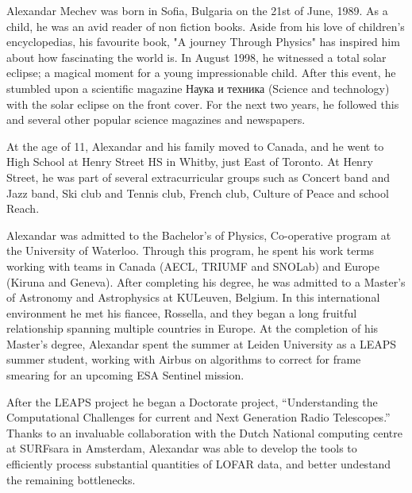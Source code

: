 Alexandar Mechev was born in Sofia, Bulgaria on the 21st of June, 1989. As a child, he was an avid reader of non fiction books. Aside from his love of children's encyclopedias, his favourite book, "A journey Through Physics" has inspired him about how fascinating the world is. In August 1998, he witnessed a total solar eclipse; a magical moment for a young impressionable child. After this event, he stumbled upon a scientific magazine Наука и техника (Science and technology) with the solar eclipse on the front cover. For the next two years, he followed this and several other popular science magazines and newspapers.

At the age of 11, Alexandar and his family moved to Canada, and he went to High School at Henry Street HS in Whitby, just East of Toronto. At Henry Street, he was part of several extracurricular groups such as Concert band and Jazz band, Ski club and Tennis club, French club, Culture of Peace and school Reach. 

Alexandar was admitted to the Bachelor's of Physics, Co-operative program at the University of Waterloo. Through this program, he spent his work terms working with teams in Canada (AECL, TRIUMF and SNOLab) and Europe (Kiruna and Geneva). After completing his degree, he was admitted to a Master's of Astronomy and Astrophysics at KULeuven, Belgium. In this international environment he met his fiancee, Rossella, and they began a long fruitful relationship spanning multiple countries in Europe. At the completion of his Master's degree, Alexandar spent the summer at Leiden University as a LEAPS summer student, working with Airbus on algorithms to correct for frame smearing for an upcoming ESA Sentinel mission. 

After the LEAPS project he began a Doctorate project, ``Understanding the Computational Challenges for current and Next Generation Radio Telescopes.'' Thanks to an invaluable collaboration with the Dutch National computing centre at SURFsara in Amsterdam, Alexandar was able to develop the tools to efficiently process substantial quantities of LOFAR data, and better undestand the remaining bottlenecks. 


 
